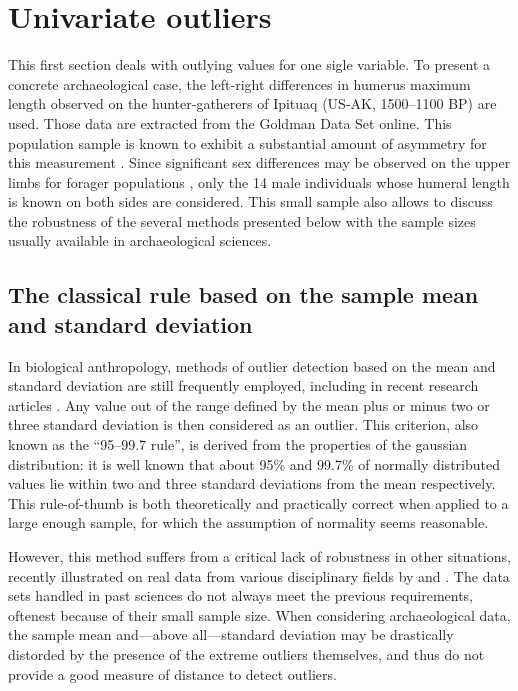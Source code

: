 \documentclass[review, 3p]{elsarticle}
\begin{document}
\section{Univariate outliers}
\label{sec:org6cd6a96}
This first section deals with outlying values for one sigle variable. To present a concrete archaeological case, the left-right differences in humerus maximum length observed on the hunter-gatherers of Ipituaq (US-AK, 1500--1100 BP) are used. Those data are extracted from the Goldman Data Set online. This population sample is known to exhibit a substantial amount of asymmetry for this measurement \citep{auerbach2008_PatternsClavicularBilateral}. Since significant sex differences may be observed on the upper limbs for forager populations \citep{weiss2009_SexDifferencesHumeral}, only the 14 male individuals whose humeral length is known on both sides are considered. This small sample also allows to discuss the robustness of the several methods presented below with the sample sizes usually available in archaeological sciences.

\subsection{The classical rule based on the sample mean and standard deviation}
\label{sec:org3f437ab}
In biological anthropology, methods of outlier detection based on the mean and standard deviation are still frequently employed, including in recent research articles \citep[e.g.,][]{bergstrom_NutritionalImportanceInvertebrates,lubritto2017_NewDietaryEvidence}. Any value out of the range defined by the mean plus or minus two or three standard deviation is then considered as an outlier. This criterion, also known as the ``95–99.7 rule'', is derived from the properties of the gaussian distribution: it is well known that about 95\% and 99.7\% of normally distributed values lie within two and three standard deviations from the mean respectively. This rule-of-thumb is both theoretically and practically correct when applied to a large enough sample, for which the assumption of normality seems reasonable.

However, this method suffers from a critical lack of robustness in other situations, recently illustrated on real data from various disciplinary fields by \cite{leys2013_DetectingOutliersNot} and \cite{lightfoot2016_UseBiomineralOxygen}. The data sets handled in past sciences do not always meet the previous requirements, oftenest because of their small sample size. When considering archaeological data, the sample mean and---above all---standard deviation may be drastically distorded by the presence of the extreme outliers themselves, and thus do not provide a good measure of distance to detect outliers.
\end{document}
